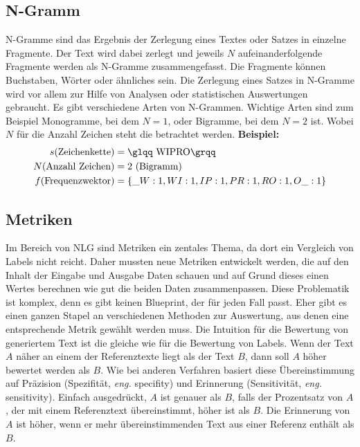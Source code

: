 \subsection{N-Gramm}
\label{sub:n-gramm}
N-Gramme sind das Ergebnis der Zerlegung eines Textes oder Satzes in einzelne Fragmente. Der Text wird dabei zerlegt und
jeweils $N$ aufeinanderfolgende Fragmente werden als N-Gramme zusammengefasst. Die Fragmente können Buchstaben, Wörter
oder ähnliches sein. Die Zerlegung eines Satzes in N-Gramme wird vor allem zur Hilfe von Analysen oder statistischen
Auswertungen gebraucht.
\newline
Es gibt verschiedene Arten von N-Grammen. Wichtige Arten sind zum Beispiel Monogramme, bei dem $N = 1$, oder Bigramme,
bei dem $N = 2$ ist. Wobei $N$ für die Anzahl Zeichen steht die betrachtet werden.
\newline
\newline
\textbf{Beispiel:}
\begin{align*}
	s (\text{Zeichenkette}) &= \text{\glqq WIPRO\grqq} \\
	N (\text{Anzahl Zeichen}) &= 2\ (\text{Bigramm}) \\
	f (\text{Frequenzwektor}) &= \{\_W:1, WI:1, IP:1, PR:1, RO:1, O\_:1\}
\end{align*}

\subsection{Metriken}
\label{sub:metrics}
Im Bereich von \gls{NLG} sind Metriken ein zentales Thema, da dort ein Vergleich von Labels nicht reicht. Daher mussten
neue Metriken entwickelt werden, die auf den Inhalt der Eingabe und Ausgabe Daten schauen und auf Grund dieses einen
Wertes berechnen wie gut die beiden Daten zusammenpassen. Diese Problematik ist komplex, denn es gibt keinen Blueprint,
der für jeden Fall passt. Eher gibt es einen ganzen Stapel an verschiedenen Methoden zur Auswertung, aus denen eine
entsprechende Metrik gewählt werden muss.
\newline
\newline
Die Intuition für die Bewertung von generiertem Text ist die gleiche wie für die Bewertung von Labels. Wenn der Text $A$
näher an einem der Referenztexte liegt als der Text $B$, dann soll $A$ höher bewertet werden als $B$. Wie bei anderen
Verfahren basiert diese Übereinstimmung auf Präzision (Spezifität, \textit{eng.} specifity) und Erinnerung
(Sensitivität, \textit{eng.} sensitivity). Einfach ausgedrückt, $A$ ist genauer als $B$, falls der Prozentsatz von $A$,
der mit einem Referenztext übereinstimmt, höher ist als $B$. Die Erinnerung von $A$ ist höher, wenn er mehr
übereinstimmenden Text aus einer Referenz enthält als $B$.

